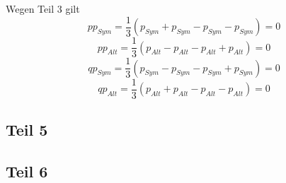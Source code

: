 \documentclass[10pt,a4paper]{article}
\begin{document}
Wegen Teil 3 gilt
\begin{equation}
pp_{Sym} = \frac{1}{3}(p_{Sym} + p_{Sym} - p_{Sym} - p_{Sym}) = 0
\end{equation}
\begin{equation}
pp_{Alt} = \frac{1}{3}(p_{Alt} - p_{Alt} - p_{Alt} + p_{Alt}) = 0
\end{equation}
\begin{equation}
qp_{Sym} = \frac{1}{3}(p_{Sym} - p_{Sym} - p_{Sym} + p_{Sym}) = 0
\end{equation}
\begin{equation}
qp_{Alt} = \frac{1}{3}(p_{Alt} + p_{Alt} - p_{Alt} - p_{Alt}) = 0
\end{equation}

\subsection*{Teil 5}

\subsection*{Teil 6}
\end{document}
